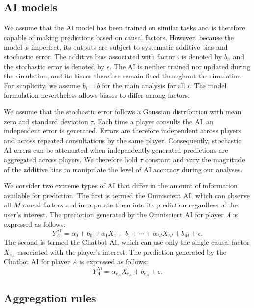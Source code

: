\documentclass[12pt]{article}
\begin{document}
\subsection*{AI models}

We assume that the AI model has been trained on similar tasks and is therefore capable of making predictions based on causal factors. However, because the model is imperfect, its outputs are subject to systematic additive bias and stochastic error. The additive bias associated with factor $i$ is denoted by $b_i$, and the stochastic error is denoted by $\epsilon$. The AI is neither trained nor updated during the simulation, and its biases therefore remain fixed throughout the simulation. 
For simplicity, we assume $b_i = b$ for the main analysis for all $i$.
The model formulation nevertheless allows biases to differ among factors.

We assume that the stochastic error follows a Gaussian distribution with mean zero and standard deviation $\tau$. Each time a player consults the AI, an independent error is generated. Errors are therefore independent across players and across repeated consultations by the same player. Consequently, stochastic AI errors can be attenuated when independently generated predictions are aggregated across players. 
We therefore hold $\tau$ constant and vary the magnitude of the additive bias to manipulate the level of AI accuracy during our analyses.

We consider two extreme types of AI that differ in the amount of information available for prediction. 
The first is termed the Omniscient AI, which can observe all $M$ causal factors and incorporate them into its prediction regardless of the user's interest. 
The prediction generated by the Omniscient AI for player $A$ is expressed as follows:
\begin{equation}
Y_A^{\mathrm{AI}} = \alpha_0 + b_0 + \alpha_1 X_1 + b_1 + \cdots + \alpha_M X_M + b_M + \epsilon.
\end{equation}
The second is termed the Chatbot AI, which can use only the single causal factor $X_{e_A}$ associated with the player's interest. The prediction generated by the Chatbot AI for player $A$ is expressed as follows:
\begin{equation}
Y_A^{\mathrm{AI}} = \alpha_{e_A} X_{e_A} + b_{e_A} + \epsilon.
\end{equation}

\subsection*{Aggregation rules}
\end{document}
